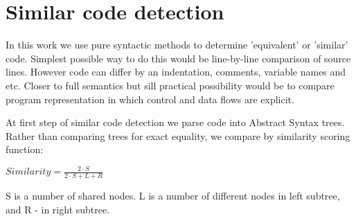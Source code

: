 \section{Similar code detection}

In this work we use pure syntactic methods to determine 'equivalent' or 'similar'
code. Simplest possible way to do this would be line-by-line comparison of
source lines. However code can differ by an indentation, comments, variable names
and etc. Closer to full semantics but sill practical possibility would be to
compare program representation in which control and data flows are explicit.

At first step of similar code detection we parse code into Abstract Syntax
trees. Rather than comparing trees for exact equality, we compare by similarity
scoring function\cite{Baxter&al1998}:


\begin{math}
Similarity =  \frac{ 2 \cdot S}{2 \cdot S + L + R}
\end{math}

S is a number of shared nodes. L is a number of different nodes in left subtree,
and R - in right subtree.
